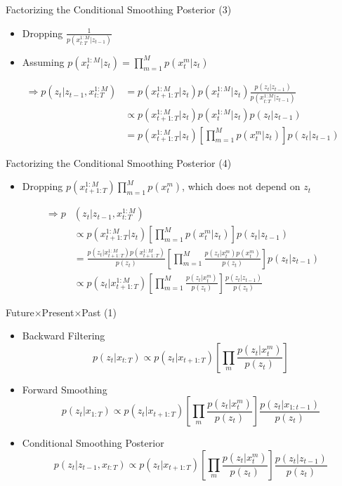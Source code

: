 \documentclass{beamer}
\begin{document}
\begin{frame}{Factorizing the Conditional Smoothing Posterior (3)}
\begin{itemize}
\item Dropping $\frac{1}{p(x_{t:T}^{1:M}|z_{t-1})}$
\item Assuming $p(x_t^{1:M}|z_t)=\prod_{m=1}^M p(x_t^m|z_t)$
\end{itemize}
\[
\begin{split}
\Rightarrow p(z_t|z_{t-1},x_{t:T}^{1:M})&=p(x_{t+1:T}^{1:M}|z_t)p(x_t^{1:M}|z_t)\frac{p(z_t|z_{t-1})}{p(x_{t:T}^{1:M}|z_{t-1})}\\
&\propto p(x_{t+1:T}^{1:M}|z_t)p(x_t^{1:M}|z_t)p(z_t|z_{t-1})\\
&= p(x_{t+1:T}^{1:M}|z_t)\left[
\prod_{m=1}^M p(x_t^m|z_t)
\right]
p(z_t|z_{t-1})
\end{split}
\]
\end{frame}

\begin{frame}{Factorizing the Conditional Smoothing Posterior (4)}
\begin{itemize}
\item Dropping $p(x_{t+1:T}^{1:M})\prod_{m=1}^M p(x_t^m)$, which does not depend on $z_t$
\end{itemize}
\[
\begin{split}
\Rightarrow p&(z_t|z_{t-1},x_{t:T}^{1:M})\\
&\propto p(x_{t+1:T}^{1:M}|z_t)\left[
\prod_{m=1}^M p(x_t^m|z_t)
\right]
p(z_t|z_{t-1})\\
&=\frac{p(z_t|x_{t+1:T}^{1:M})p(x_{t+1:T}^{1:M})}{p(z_t)}\left[
\prod_{m=1}^M \frac{p(z_t|x_t^m)p(x_t^m)}{p(z_t)}
\right]
p(z_t|z_{t-1})\\
&\propto
p(z_t|x_{t+1:T}^{1:M})\left[
\prod_{m=1}^M \frac{p(z_t|x_t^m)}{p(z_t)}
\right]
\frac{p(z_t|z_{t-1})}{p(z_t)}
\end{split}
\]
\end{frame}

\begin{frame}{Future$\times$Present$\times$Past (1)}
\begin{itemize}
\item Backward Filtering\[
p(z_t|x_{t:T})\propto p(z_t|x_{t+1:T})\left[\prod_m\frac{p(z_t|x_t^m)}{p(z_t)}\right]
\]
\item Forward Smoothing\[
p(z_t|x_{1:T})\propto p(z_t|x_{t+1:T})\left[\prod_m\frac{p(z_t|x_t^m)}{p(z_t)}\right]\frac{p(z_t|x_{1:t-1})}{p(z_t)}
\]
\item Conditional Smoothing Posterior\[
p(z_t|z_{t-1},x_{t:T})\propto p(z_t|x_{t+1:T})\left[\prod_m \frac{p(z_t|x_t^m)}{p(z_t)}\right]\frac{p(z_t|z_{t-1})}{p(z_t)}
\]
\end{itemize}
\end{frame}
\end{document}
